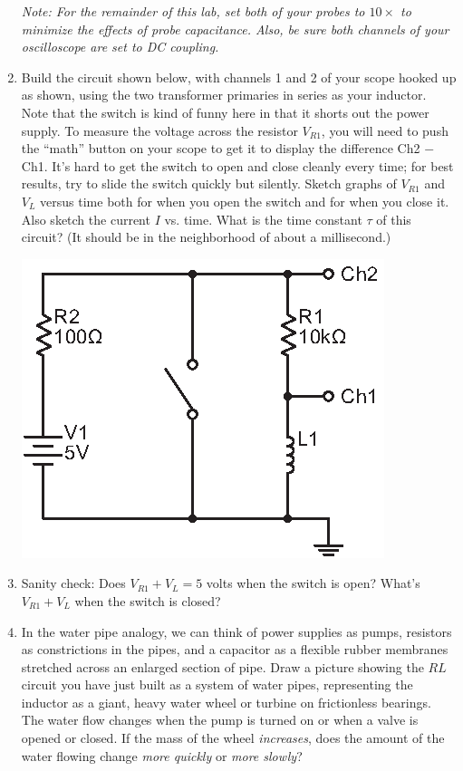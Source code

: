 \begin{enumerate}[wide]
\medskip 

\textit{Note: For the remainder of this lab, set both of your probes to $10\times$ to minimize the effects of probe capacitance. Also, be sure both channels of your oscilloscope are set to DC coupling.}

\item Build the circuit shown below, with channels 1 and 2 of your scope hooked up as shown, using the two transformer primaries in series as your inductor.  Note that the switch is kind of funny here in that it shorts out the power supply.  To measure the voltage across the resistor $V_{R1}$, you will need to push the ``math'' button on your scope to get it to display the difference Ch2 $-$ Ch1.  It's hard to get the switch to open and close cleanly every time; for best results, try to slide the switch quickly but silently.  Sketch graphs of $V_{R1}$ and $V_L$ versus time both for when you open the switch and for when you close it.   Also sketch the current $I$ vs. time.  What is the time constant $\tau$ of this circuit?  (It should be in the neighborhood of about a millisecond.)  \label{part_rl_constant}
\begin{center}
\includegraphics{inductors/single_dc_inductor.eps}
\end{center}

\item Sanity check: Does $V_{R1} +V_L = 5$ volts when the switch is open?  What's $V_{R1} +V_L$ when the switch is closed?

\item In the water pipe analogy, we can think of power supplies as pumps, resistors as constrictions in the pipes, and a capacitor as a flexible rubber membranes stretched across an enlarged section of pipe.  Draw a picture showing the $RL$ circuit you have just built as a system of water pipes, representing the inductor as a giant, heavy water wheel or turbine on frictionless bearings.  
The water flow changes when the pump is turned on or when a valve is opened or closed.
If the mass of the wheel \textit{increases}, does the amount of the water flowing change \textit{more quickly} or \textit{more slowly}?


\end{enumerate}
